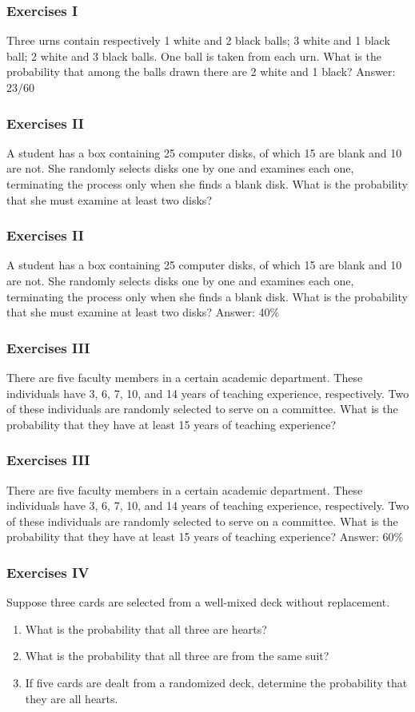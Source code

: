\documentclass[xcolor=dvipsnames]{beamer}
\begin{document}
\begin{frame}
  \frametitle{Exercises I}
Three urns contain respectively 1 white and 2 black balls; 3 white and
1 black ball; 2 white and 3 black balls. One ball is taken from each
urn. What is the probability that among the balls drawn there are 2
white and 1 black? Answer: $23/60$
\end{frame}

\begin{frame}
  \frametitle{Exercises II}
A student has a box containing 25 computer disks, of which 15 are
blank and 10 are not. She randomly selects disks one by one and
examines each one, terminating the process only when she finds a blank
disk. What is the probability that she must examine at least two disks?
\end{frame}

\begin{frame}
  \frametitle{Exercises II}
A student has a box containing 25 computer disks, of which 15 are
blank and 10 are not. She randomly selects disks one by one and
examines each one, terminating the process only when she finds a blank
disk. What is the probability that she must examine at least two
disks? Answer: 40\%
\end{frame}

\begin{frame}
  \frametitle{Exercises III}
There are five faculty members in a certain academic department. These
individuals have 3, 6, 7, 10, and 14 years of teaching experience,
respectively. Two of these individuals are randomly selected to serve
on a committee. What is the probability that they have at least 15
years of teaching experience?
\end{frame}

\begin{frame}
  \frametitle{Exercises III}
There are five faculty members in a certain academic department. These
individuals have 3, 6, 7, 10, and 14 years of teaching experience,
respectively. Two of these individuals are randomly selected to serve
on a committee. What is the probability that they have at least 15
years of teaching experience? Answer: 60\%
\end{frame}

\begin{frame}
  \frametitle{Exercises IV}
Suppose three cards are selected from a well-mixed deck without
replacement. 
\begin{enumerate}
\item<1-> What is the probability that all three are hearts?
\item<2-> What is the probability that all three are from the same
  suit?
\item<3-> If five cards are dealt from a randomized deck, determine
  the probability that they are all hearts.
\end{enumerate}
\end{frame}
\end{document}
